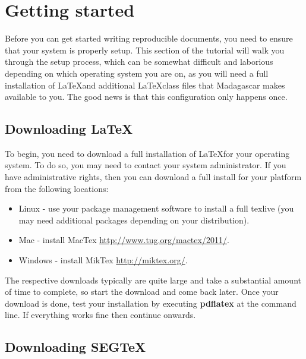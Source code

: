 \newcommand{\maindir}{\$RSFSRC/book/tutorial}
\newcommand{\exampledir}{\maindir/authors}

\section{Getting started}

Before you can get started writing reproducible documents, you need to ensure that your system is properly setup.  This section of the tutorial will walk you through the setup process, which can be somewhat difficult and laborious depending on which operating system you are on, as you will need a full installation of \LaTeX and additional \LaTeX class files that Madagascar makes available to you. The good news is that this configuration only happens once.

\subsection{Downloading \LaTeX}

To begin, you need to download a full installation of \LaTeX for your operating system.  To do so, you may need to contact your system administrator.  If you have administrative rights, then you can download a full install for your platform from the following locations:

\begin{itemize}
\item Linux - use your package management software to install a full texlive (you may need additional packages depending on your distribution).
\item Mac - install MacTex \url{http://www.tug.org/mactex/2011/}.
\item Windows - install MikTex \url{http://miktex.org/}.
\end{itemize}

The respective downloads typically are quite large and take a substantial amount of time to complete, so start the download and come back later.  Once your download is done, test your installation by executing \textbf{pdflatex} at the command line.  If everything works fine then continue onwards.

\subsection{Downloading SEGTeX}

